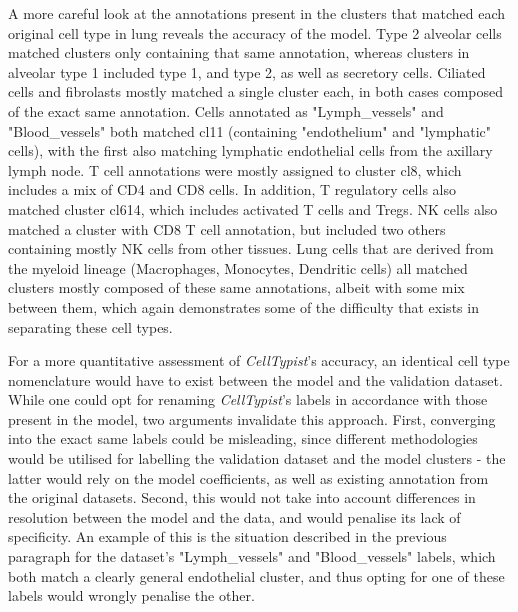 A more careful look at the annotations present in the clusters that matched each original cell type in lung reveals the accuracy of the model. Type 2 alveolar cells matched clusters only containing that same annotation, whereas clusters in alveolar type 1 included type 1, and type 2, as well as secretory cells. Ciliated cells and fibrolasts mostly matched a single cluster each, in both cases composed of the exact same annotation. Cells annotated as "Lymph\_vessels" and "Blood\_vessels" both matched cl11 (containing "endothelium" and "lymphatic" cells), with the first also matching lymphatic endothelial cells from the axillary lymph node. T cell annotations were mostly assigned to cluster cl8, which includes a mix of CD4 and CD8 cells. In addition, T regulatory cells also matched cluster cl614, which includes activated T cells and Tregs. NK cells also matched a cluster with CD8 T cell annotation, but included two others containing mostly NK cells from other tissues. Lung cells that are derived from the myeloid lineage (Macrophages, Monocytes, Dendritic cells) all matched clusters mostly composed of these same annotations, albeit with some mix between them, which again demonstrates some of the difficulty that exists in separating these cell types.

For a more quantitative assessment of \textit{CellTypist}'s accuracy, an identical cell type nomenclature would have to exist between the model and the validation dataset. While one could opt for renaming \textit{CellTypist}'s labels in accordance with those present in the model, two arguments invalidate this approach. First, converging into the exact same labels could be misleading, since different methodologies would be utilised for labelling the validation dataset and the model clusters - the latter would rely on the model coefficients, as well as existing annotation from the original datasets. Second, this would not take into account differences in resolution between the model and the data, and would penalise its lack of specificity. An example of this is the situation described in the previous paragraph for the dataset's "Lymph\_vessels" and "Blood\_vessels" labels, which both match a clearly general endothelial cluster, and thus opting for one of these labels would wrongly penalise the other.

